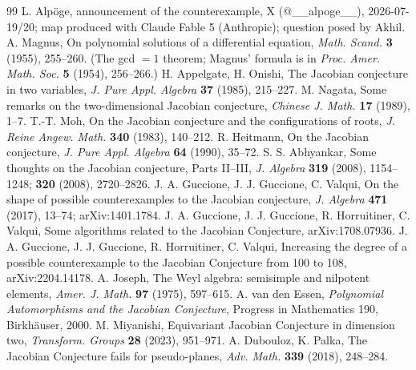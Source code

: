 \documentclass[11pt]{article}
\theoremstyle{remark}
\begin{document}
\begin{thebibliography}{99}
 L. Alp\"oge, announcement of the counterexample, X (@\_\_alpoge\_\_),
2026-07-19/20; map produced with Claude Fable 5 (Anthropic); question posed by Akhil.
 A. Magnus, On polynomial solutions of a differential equation,
\emph{Math. Scand.} \textbf{3} (1955), 255--260. (The gcd $=1$ theorem; Magnus' formula is
in \emph{Proc. Amer. Math. Soc.} \textbf{5} (1954), 256--266.)
 H. Appelgate, H. Onishi, The Jacobian conjecture in two
variables, \emph{J. Pure Appl. Algebra} \textbf{37} (1985), 215--227.
 M. Nagata, Some remarks on the two-dimensional Jacobian conjecture,
\emph{Chinese J. Math.} \textbf{17} (1989), 1--7.
 T.-T. Moh, On the Jacobian conjecture and the configurations of roots,
\emph{J. Reine Angew. Math.} \textbf{340} (1983), 140--212.
 R. Heitmann, On the Jacobian conjecture, \emph{J. Pure Appl.
Algebra} \textbf{64} (1990), 35--72.
 S. S. Abhyankar, Some thoughts on the Jacobian conjecture, Parts
II--III, \emph{J. Algebra} \textbf{319} (2008), 1154--1248; \textbf{320} (2008),
2720--2826.
 J. A. Guccione, J. J. Guccione, C. Valqui, On the shape of possible
counterexamples to the Jacobian conjecture, \emph{J. Algebra} \textbf{471} (2017), 13--74;
arXiv:1401.1784.
 J. A. Guccione, J. J. Guccione, R. Horruitiner, C. Valqui, Some
algorithms related to the Jacobian Conjecture, arXiv:1708.07936.
 J. A. Guccione, J. J. Guccione, R. Horruitiner, C. Valqui, Increasing
the degree of a possible counterexample to the Jacobian Conjecture from 100 to 108,
arXiv:2204.14178.
 A. Joseph, The Weyl algebra: semisimple and nilpotent elements,
\emph{Amer. J. Math.} \textbf{97} (1975), 597--615.
 A. van den Essen, \emph{Polynomial Automorphisms and the Jacobian
Conjecture}, Progress in Mathematics 190, Birkh\"auser, 2000.
 M. Miyanishi, Equivariant Jacobian Conjecture in dimension two,
\emph{Transform. Groups} \textbf{28} (2023), 951--971.
 A. Dubouloz, K. Palka, The Jacobian Conjecture fails for
pseudo-planes, \emph{Adv. Math.} \textbf{339} (2018), 248--284.
\end{thebibliography}
\end{document}
